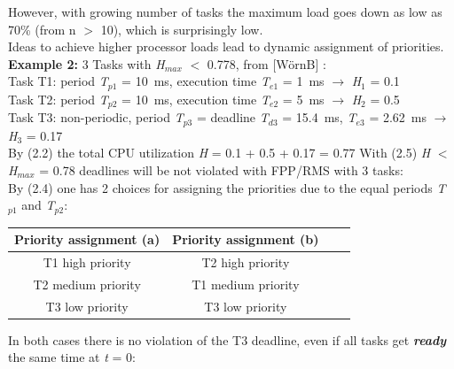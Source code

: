 However, with growing number of tasks the maximum load goes down as low as 70\% (from n $\mathrm{>}$ 10), which is surprisingly low.\\

Ideas to achieve higher processor loads lead to dynamic assignment of priorities.\\

 \textbf{Example 2:} 3 Tasks with \textit{H}${}_{max}$ $\mathrm{<}$ 0.778, from [W\"{o}rnB] :\\
Task T1: period \textit{T}${}_{p1}$ = 10~ms, execution time \textit{T}${}_{e1}$ = 1~ms  $\rightarrow$ \textit{H}${}_{1}$ = 0.1\\
Task T2: period \textit{T}${}_{p2}$ = 10~ms, execution time\textit{ T}${}_{e2}$ = 5~ms  $\rightarrow$ \textit{H}${}_{2}$ = 0.5\\
Task T3: non-periodic, period \textit{T}${}_{p3}$ = deadline \textit{T}${}_{d3}$ = 15.4~ms, \textit{T}${}_{e3}$ = 2.62~ms  $\rightarrow$ \textit{H}${}_{3}$ = 0.17\\

By (2.2) the total CPU utilization \textit{H} = 0.1 + 0.5 + 0.17 = 0.77 With (2.5) \textit{H} $\mathrm{<}$ \textit{H}${}_{max}$ = 0.78 deadlines will be not violated with FPP/RMS with 3 tasks:\\

By (2.4) one has 2 choices for assigning the priorities due to the equal periods \textit{T}${}_{p1}$\textit{ }and \textit{T}${}_{p2}$:

\begin{table}[h!]
\setlength{\tabcolsep}{10pt} %
\renewcommand{\arraystretch}{1.5} %
\small
\centering
 \begin{tabular}{|c|c|c|c|} 
 \hline
 \textbf{Priority assignment (a)} & \textbf{Priority assignment (b)} \\ [0.1ex] 
 \hline
 T1  high priority & T2  high  priority \\ 
 \hline
 T2  medium priority & T1  medium priority \\ 
  \hline
 T3  low priority & T3  low priority  \\ 
 \hline
 \end{tabular}
\end{table}

In both cases there is no violation of the T3 deadline, even if all tasks get \textbf{\textit{ready}} the same time at \textit{t} = 0: 
	
